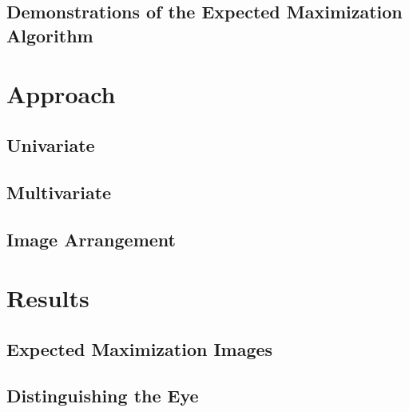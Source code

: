 \documentclass[]{article}
\begin{document}

\subsection{Demonstrations of the Expected Maximization Algorithm} %
\label{sub:demonstrations_of_the_expected_maximization_algorithm}



\section{Approach} %
\label{sec:approach}

\subsection{Univariate} %
\label{sub:univariate}


\subsection{Multivariate} %
\label{sub:multivariate}


\subsection{Image Arrangement} %
\label{sub:image_arrangement}



\section{Results} %
\label{sec:results}

\subsection{Expected Maximization Images} %
\label{sub:expected_maximization_images}


\subsection{Distinguishing the Eye} %
\label{sub:distinguishing_the_eye}
\end{document}
